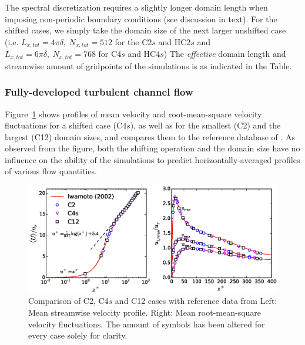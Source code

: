\begin{table}
\begin{threeparttable}
			\begin{tablenotes}
				\small 
				\item The spectral discretization requires a slightly longer domain length when imposing non-periodic boundary conditions (see discussion in text). For the shifted cases, we simply take the domain size of the next larger unshifted case (i.e. $L_{x,tot} = 4\pi\delta,~N_{x,tot} = 512$  for the C2$s$ and HC2$s$ and $L_{x,tot} = 6\pi\delta,~N_{x,tot} = 768$ for C4$s$ and HC4$s$) The \emph{effective} domain length and streamwise amount of gridpoints of the simulations is as indicated in the Table.
			\end{tablenotes}
		
			\end{threeparttable}
			
		\end{table}
	
		\subsubsection{Fully-developed turbulent channel flow}
		Figure~\ref{fig:validation} shows profiles of mean velocity and root-mean-square velocity fluctuations for a shifted case (C4$s$), as
		well as for the smallest (C2) and the largest (C12) domain sizes, and compares them to the reference database of
		\cite{iwamoto2002reynolds}. As observed from the figure, both the shifting operation and the domain size have no influence on the ability of the simulations to predict horizontally-averaged profiles of various flow quantities. 
		
		\begin{figure}
			\centering
			\includegraphics[width=\textwidth,trim= 0cm 0.35cm 0cm 0.3cm,clip]{chapters/turbulent_inflow/spbc/figure3}
			\caption[Comparison of C2, C4$s$ and C12 cases with reference data from \cite{iwamoto2002reynolds}]{Comparison of C2, C4$s$ and C12 cases with reference data from \cite{iwamoto2002reynolds} Left: Mean streamwise velocity profile. Right: Mean root-mean-square velocity fluctuations. The amount of symbols has been altered for every case solely for clarity.}
			\label{fig:validation}
		\end{figure}
		
